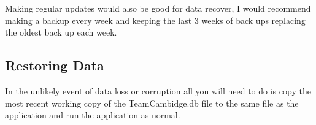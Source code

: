 Making regular updates would also be good for data recover, I would recommend making a backup every week and keeping the last 3 weeks of back ups replacing the oldest back up each week. 
\subsection{Restoring Data}
In the unlikely event of data loss or corruption all you will need to do is copy the most recent working copy of the TeamCambidge.db file to the same file as the application and run the application as normal.

\stopcontents[UserManual]
